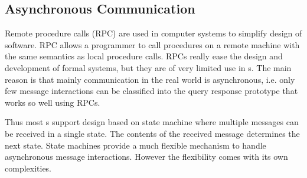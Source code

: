 \subsection{Asynchronous Communication}
Remote procedure calls (RPC) are used in computer systems to simplify design of software. RPC allows a programmer to call procedures on a remote machine with the same semantics as local procedure calls. RPCs really ease the design and development of formal systems, but they are of very limited use in \rts s. The main reason is that mainly communication in the real world is asynchronous, i.e. only few message interactions can be classified into the query response prototype that works so well using RPCs.

Thus most \rts s support design based on state machine where multiple messages can be received in a single state. The contents of the received message determines the next state. State machines provide a much flexible mechanism to handle asynchronous message interactions. However the flexibility comes with its own complexities.

